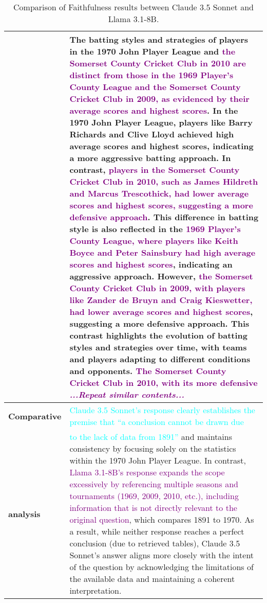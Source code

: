 \begin{table*}[htbp]
\begin{small}
\begin{tabularx}{\textwidth}{%
>{\arraybackslash}p{}
>{\arraybackslash}X
}
& The batting styles and strategies of players in the 1970 John Player League and \textcolor{purple}{the Somerset County Cricket Club in 2010 are distinct from those in the 1969 Player's County League and the Somerset County Cricket Club in 2009, as evidenced by their average scores and highest scores}. In the 1970 John Player League, players like Barry Richards and Clive Lloyd achieved high average scores and highest scores, indicating a more aggressive batting approach. In contrast, \textcolor{purple}{players in the Somerset County Cricket Club in 2010, such as James Hildreth and Marcus Trescothick, had lower average scores and highest scores, suggesting a more defensive approach}. This difference in batting style is also reflected in the \textcolor{purple}{1969 Player's County League, where players like Keith Boyce and Peter Sainsbury had high average scores and highest scores}, indicating an aggressive approach. However, \textcolor{purple}{the Somerset County Cricket Club in 2009, with players like Zander de Bruyn and Craig Kieswetter, had lower average scores and highest scores}, suggesting a more defensive approach. This contrast highlights the evolution of batting styles and strategies over time, with teams and players adapting to different conditions and opponents. \textcolor{purple}{The Somerset County Cricket Club in 2010, with its more defensive \textit{...Repeat similar contents...}} \\ \midrule
\textbf{Comparative}
& \textcolor{cyan}{Claude 3.5 Sonnet’s response clearly establishes the premise that “a conclusion cannot be drawn due} \\
\textbf{analysis}
& \textcolor{cyan}{to the lack of data from 1891”} and maintains consistency by focusing solely on the statistics within the 1970 John Player League. In contrast, \textcolor{purple}{Llama 3.1-8B’s response expands the scope excessively by referencing multiple seasons and tournaments (1969, 2009, 2010, etc.), including information that is not directly relevant to the original question}, which compares 1891 to 1970. As a result, while neither response reaches a perfect conclusion (due to retrieved tables), Claude 3.5 Sonnet’s answer aligns more closely with the intent of the question by acknowledging the limitations of the available data and maintaining a coherent interpretation. \\
\bottomrule
\end{tabularx}
\end{small}
\caption{Comparison of \eval Faithfulness results between Claude 3.5 Sonnet and Llama 3.1-8B.}
\label{case:comparison_i}
\end{table*}